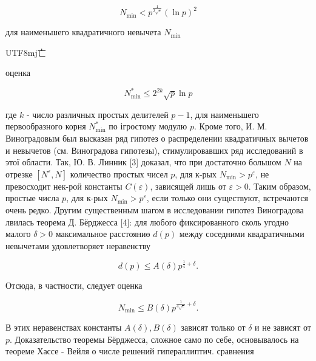 \documentclass[10pt]{article}
\begin{document}
\[

N_{\min }<p^{\frac{1}{2 \sqrt{e}}}(\ln p)^{2}

\]



для наименьшего квадратичного невычета $N_{\min }$ \begin{CJK}{UTF8}{mj}亡\end{CJK} оценка



\[

N_{\min }^{*} \leqslant 2^{2 k} \sqrt{p} \ln p

\]



где $k$ - число различных простых делителей $p-1$, для наименьшего первообразного корня $N_{\min }^{*}$ по ігростому модулю $p$. Кроме того, И. М. Виноградовым был высказан ряд гипотез о распределении квадратичных вычетов и невычетов (см. Виноградова гипотезы), стимулировавших ряд исследований в этої области. Так, Ю. В. Линник [3] доказал, что при достаточно большом $N$ на отрезке $\left[N^{\varepsilon}, N\right]$ количество простых чисел $p$, для к-рых $N_{\min }>p^{\varepsilon}$, не превосходит нек-роӥ константы $C(\varepsilon)$, зависящей лишь от $\varepsilon>0$. Таким образом, простые числа $p$, для к-рых $N_{\min }>p^{\varepsilon}$, если только они существуют, встречаются очень редко. Другим существенным шагом в исследовании гипотез Виноградова лвилась теорема Д. Бёрджесса [4]: для любого фиксированного сколь угодно малого $\delta>0$ максимальное расстояниө $d(p)$ между соседними квадратичными невычетами удовлетворяет неравенству



\[

d(p) \leqslant A(\delta) p^{\frac{1}{4}+\delta} .

\]



Отсюда, в частности, следует оценка



\[

N_{\min } \leqslant B(\delta) p^{\frac{1}{4 \sqrt{e}}+\delta} .

\]



В этих неравенствах константы $A(\delta), B(\delta)$ зависят только от $\delta$ и не зависят от $p$. Доказательство теоремы Бёрджесса, сложное само по себе, основывалось на теореме Хассе - Вейля о числе решений гиперәллиптич. сравнения
\end{document}
